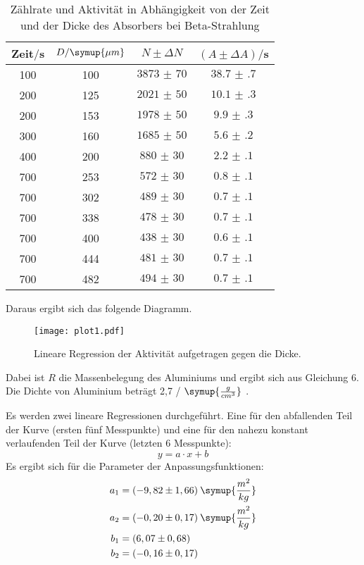 \begin{table}[H]
  \centering
  \caption{Zählrate und Aktivität in Abhängigkeit von der Zeit und der Dicke des Absorbers bei Beta-Strahlung}
  \label{tab:}
  \begin{tabular}{c c c c}
    \toprule
    Zeit$/$s & $D/\symup{\mu m}$ & $N \pm \Delta N$ & $(A \pm \Delta A)/$s\\
    \midrule
    100 & 100 & $\num{3873(70)}$  &  $\num{38.7(7)}$ \\
    200 & 125 & $\num{2021(50)}$ &   $\num{10.1(3)}$ \\
    200 & 153 & $\num{1978(50)}$ &   $\num{9.9(3)}$ \\
    300 & 160 & $\num{1685(50)}$ &  $\num{5.6(2)}$ \\
    400 & 200 & $\num{880(30)}$ & $\num{2.2(1)}$ \\
    700 & 253 & $\num{572(30)}$ & $\num{0.8(1)}$ \\
    700 & 302 & $\num{489(30)}$ & $\num{0.7(1)}$ \\
    700 & 338 & $\num{478(30)}$ & $\num{0.7(1)}$ \\
    700 & 400 & $\num{438(30)}$ & $\num{0.6(1)}$ \\
    700 & 444 & $\num{481(30)}$ & $\num{0.7(1)}$ \\
    700 & 482 & $\num{494(30)}$ & $\num{0.7(1)}$ \\
    \bottomrule
  \end{tabular}
\end{table}

Daraus ergibt sich das folgende Diagramm.

\begin{figure}[H]
  \centering
  \texttt{[image: plot1.pdf]}
  \caption{Lineare Regression der Aktivität aufgetragen gegen die Dicke.}
  \label{fig:plot1}
\end{figure}

Dabei ist $R$ die Massenbelegung des Aluminiums und ergibt sich aus Gleichung 6.
Die Dichte von Aluminium beträgt 2,7 / $\symup{\frac{g}{cm^3}}$ \cite{sample1}.

Es werden zwei lineare Regressionen durchgeführt. Eine für den abfallenden Teil der Kurve (ersten fünf Messpunkte)
und eine für den nahezu konstant verlaufenden Teil der Kurve (letzten 6 Messpunkte):
\begin{equation*}
  y = a\cdot x + b
\end{equation*}
Es ergibt sich für die Parameter der  Anpassungsfunktionen:
\begin{align*}
  a_1 &= (-9,82 \pm 1,66) \: \symup{\frac{m^2}{kg}} \\
  a_2 &= (-0,20 \pm 0,17) \: \symup{\frac{m^2}{kg}} \\
  b_1 &= (6,07 \pm 0,68) \\
  b_2 &= (-0,16 \pm 0,17)
\end{align*}

